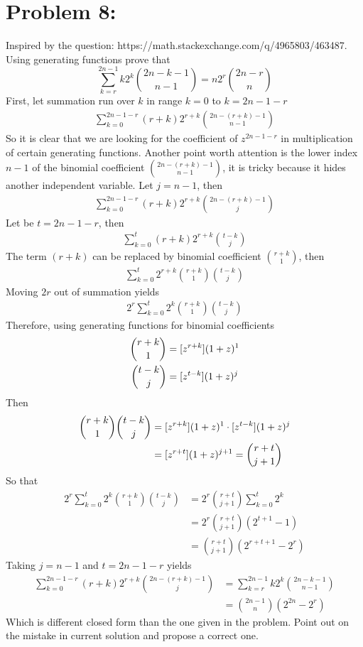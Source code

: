 ﻿\section{Problem 8:}
\label{sec:problem-8}
Inspired by the question: https://math.stackexchange.com/q/4965803/463487.
Using generating functions prove that
\begin{equation*}
    \sum_{k=r}^{2n-1} k2^k \binom{2n-k-1}{n-1} = n2^r \binom{2n-r}{n}
\end{equation*}
First, let summation run over $k$ in range $k=0$ to $k=2n-1-r$
\begin{align*}
    \sum_{k=0}^{2n-1-r} (r+k) 2^{r+k} \binom{2n-(r+k)-1}{n-1}
\end{align*}
So it is clear that we are looking for the coefficient of $z^{2n-1-r}$ in multiplication of certain generating functions.
Another point worth attention is the lower index $n-1$ of the binomial coefficient $\binom{2n-(r+k)-1}{n-1}$,
it is tricky because it hides another independent variable.
Let $j=n-1$, then
\begin{align*}
    \sum_{k=0}^{2n-1-r} (r+k) 2^{r+k} \binom{2n-(r+k)-1}{j}
\end{align*}
Let be $t=2n-1-r$, then
\begin{align*}
    \sum_{k=0}^{t} (r+k) 2^{r+k} \binom{t-k}{j}
\end{align*}
The term $(r+k)$ can be replaced by binomial coefficient $\binom{r+k}{1}$, then
\begin{align*}
    \sum_{k=0}^{t} 2^{r+k} \binom{r+k}{1} \binom{t-k}{j}
\end{align*}
Moving $2r$ out of summation yields
\begin{align*}
    2^r \sum_{k=0}^{t} 2^{k} \binom{r+k}{1} \binom{t-k}{j}
\end{align*}
Therefore, using generating functions for binomial coefficients
\begin{align*}
    \binom{r+k}{1} &= [z^{r+k}] (1+z)^1 \\
    \binom{t-k}{j} &= [z^{t-k}] (1+z)^j
\end{align*}
Then
\begin{align*}
    \binom{r+k}{1} \binom{t-k}{j} &= [z^{r+k}] (1+z)^1 \cdot [z^{t-k}] (1+z)^j \\
    &= [z^{r+t}] (1+z)^{j+1} = \binom{r+t}{j+1}
\end{align*}
So that
\begin{align*}
    2^r \sum_{k=0}^{t} 2^{k} \binom{r+k}{1} \binom{t-k}{j} &= 2^r \binom{r+t}{j+1} \sum_{k=0}^{t} 2^{k} \\
    &= 2^r \binom{r+t}{j+1} (2^{t+1} - 1) \\
    &= \binom{r+t}{j+1} (2^{r+t+1} - 2^r)
\end{align*}
Taking $j=n-1$ and $t=2n-1-r$ yields
\begin{align*}
    \sum_{k=0}^{2n-1-r} (r+k) 2^{r+k} \binom{2n-(r+k)-1}{j} &= \sum_{k=r}^{2n-1} k2^k \binom{2n-k-1}{n-1} \\
    &= \binom{2n-1}{n} (2^{2n} - 2^r)
\end{align*}
Which is different closed form than the one given in the problem.
Point out on the mistake in current solution and propose a correct one.


\clearpage
